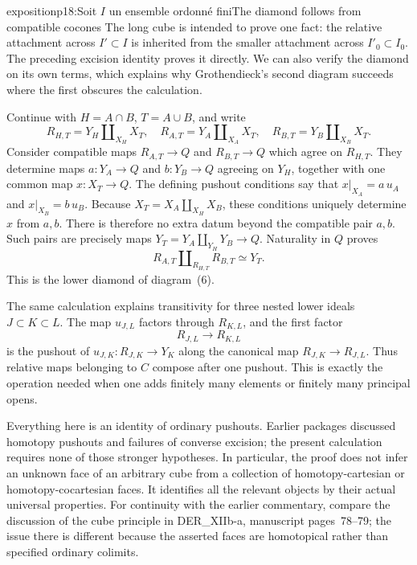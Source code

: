 \begin{dcomment}{exposition}{p18:Soit $I$ un ensemble ordonné fini}{The diamond follows from compatible cocones}
The long cube is intended to prove one fact: the relative attachment across $I'\subset I$ is inherited from the smaller attachment across $I'_0\subset I_0$. The preceding excision identity proves it directly. We can also verify the diamond on its own terms, which explains why Grothendieck's second diagram succeeds where the first obscures the calculation.

Continue with $H=A\cap B$, $T=A\cup B$, and write
\[
 R_{H,T}=Y_H\amalg_{X_H}X_T,
 \quad R_{A,T}=Y_A\amalg_{X_A}X_T,
 \quad R_{B,T}=Y_B\amalg_{X_B}X_T.
\]
Consider compatible maps $R_{A,T}\to Q$ and $R_{B,T}\to Q$ which agree on $R_{H,T}$. They determine maps $a:Y_A\to Q$ and $b:Y_B\to Q$ agreeing on $Y_H$, together with one common map $x:X_T\to Q$. The defining pushout conditions say that $x|_{X_A}=a\,u_A$ and $x|_{X_B}=b\,u_B$. Because $X_T=X_A\amalg_{X_H}X_B$, these conditions uniquely determine $x$ from $a,b$. There is therefore no extra datum beyond the compatible pair $a,b$. Such pairs are precisely maps $Y_T=Y_A\amalg_{Y_H}Y_B\to Q$. Naturality in $Q$ proves
\[
 R_{A,T}\amalg_{R_{H,T}}R_{B,T}\simeq Y_T.
\]
This is the lower diamond of diagram~(6).

The same calculation explains transitivity for three nested lower ideals $J\subset K\subset L$. The map $u_{J,L}$ factors through $R_{K,L}$, and the first factor
\[
 R_{J,L}\longrightarrow R_{K,L}
\]
is the pushout of $u_{J,K}:R_{J,K}\to Y_K$ along the canonical map $R_{J,K}\to R_{J,L}$. Thus relative maps belonging to $C$ compose after one pushout. This is exactly the operation needed when one adds finitely many elements or finitely many principal opens.

Everything here is an identity of ordinary pushouts. Earlier packages discussed homotopy pushouts and failures of converse excision; the present calculation requires none of those stronger hypotheses. In particular, the proof does not infer an unknown face of an arbitrary cube from a collection of homotopy-cartesian or homotopy-cocartesian faces. It identifies all the relevant objects by their actual universal properties. For continuity with the earlier commentary, compare the discussion of the cube principle in DER\_XIIb-a, manuscript pages~78--79; the issue there is different because the asserted faces are homotopical rather than specified ordinary colimits.
\end{dcomment}


